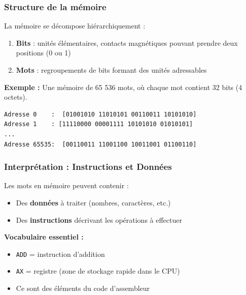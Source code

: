 \documentclass[12pt,a4paper]{article}
\begin{document}
\subsubsection{Structure de la mémoire}

\begin{definition}
La mémoire se décompose hiérarchiquement : 

\begin{enumerate}
    \item \textbf{Bits} : unités élémentaires, contacts magnétiques pouvant prendre deux positions (0 ou 1)
    \item \textbf{Mots} : regroupements de bits formant des unités adressables
\end{enumerate}
\end{definition}

\begin{exemple}
\textbf{Exemple : } Une mémoire de 65 536 mots, où chaque mot contient 32 bits (4 octets).

\begin{verbatim}
Adresse 0    :  [01001010 11010101 00110011 10101010]
Adresse 1    : [11110000 00001111 10101010 01010101]
... 
Adresse 65535:  [00110011 11001100 10011001 01100110]
\end{verbatim}
\end{exemple}

\subsubsection{Interprétation :  Instructions et Données}

\begin{important}
Les mots en mémoire peuvent contenir :
\begin{itemize}
    \item Des \textcolor{algoviolet}{\textbf{données}} à traiter (nombres, caractères, etc.)
    \item Des \textcolor{importantrouge}{\textbf{instructions}} décrivant les opérations à effectuer
\end{itemize}
\end{important}

\begin{notecours}
\textbf{Vocabulaire essentiel :}
\begin{itemize}
    \item \texttt{ADD} = instruction d'addition
    \item \texttt{AX} = registre (zone de stockage rapide dans le CPU)
    \item Ce sont des éléments du code d'assembleur
\end{itemize}
\end{notecours}
\end{document}
